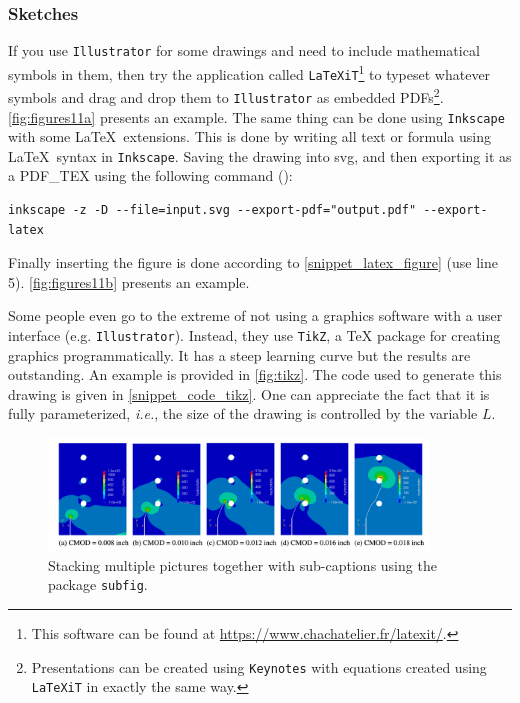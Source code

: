 \documentclass[authoryear,3p,times,preprint,review,fleqn]{elsarticle}
\newcommand{\ie}{\textit{i.e.},\xspace}
\numberwithin{equation}{section}
\theoremstyle{remark}
\begin{document}
\subsubsection{Sketches}\label{sec:sketches}

If you use \texttt{Illustrator} for some drawings and need to include mathematical symbols in them, then try the application called \texttt{LaTeXiT}\footnote{This software can be found at \url{https://www.chachatelier.fr/latexit/}.} to typeset whatever symbols and drag and drop them to \texttt{Illustrator} as embedded PDFs\footnote{Presentations can be created using \texttt{Keynotes} with equations created using \texttt{LaTeXiT} in exactly the same way.}.  \cref{fig:figures11a} presents an example. The same thing can be done using \texttt{Inkscape} with some \LaTeX\ extensions. This is done by writing all text or formula using \LaTeX\ syntax in \texttt{Inkscape}. Saving the drawing into svg, and then exporting it as a PDF\_TEX using the following command (\cite{inkscape}):
\begin{verbatim}
inkscape -z -D --file=input.svg --export-pdf="output.pdf" --export-latex
\end{verbatim}
Finally inserting the figure is done according to \cref{snippet_latex_figure} (use line 5). \cref{fig:figures11b} presents an example.

Some people even go to the extreme of not using a graphics software with a user interface (e.g. \texttt{Illustrator}). Instead, they use  \texttt{TikZ}, a TeX package for creating graphics programmatically. It has a steep learning curve but the results are outstanding. An example is provided in \cref{fig:tikz}. The code used to generate this drawing is given in \cref{snippet_code_tikz}. One can appreciate the fact that it is fully parameterized, \ie the size of the drawing is controlled by the variable $L$.




\begin{figure}[!h]
  \centering
\includegraphics[width=0.9\textwidth]{figures1}
  \caption{Stacking multiple pictures together with sub-captions using the package \texttt{subfig}.}
  \label{fig:figures1}
\end{figure}
\end{document}
